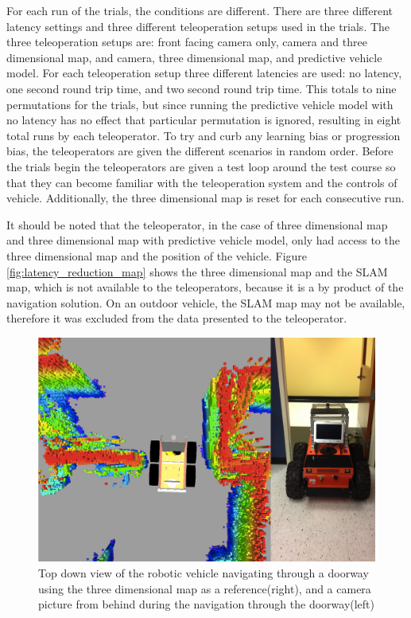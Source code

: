 \documentclass[12pt]{report}
\begin{document}
For each run of the trials, the conditions are different.  There are three different latency settings and three different teleoperation setups used in the trials.  The three teleoperation setups are: front facing camera only, camera and three dimensional map, and camera, three dimensional map, and predictive vehicle model.  For each teleoperation setup three different latencies are used: no latency, one second round trip time, and two second round trip time.  This totals to nine permutations for the trials, but since running the predictive vehicle model with no latency has no effect that particular permutation is ignored, resulting in eight total runs by each teleoperator.  To try and curb any learning bias or progression bias, the teleoperators are given the different scenarios in random order.  Before the trials begin the teleoperators are given a test loop around the test course so that they can become familiar with the teleoperation system and the controls of vehicle.  Additionally, the three dimensional map is reset for each consecutive run.

It should be noted that the teleoperator, in the case of three dimensional map and three dimensional map with predictive vehicle model, only had access to the three dimensional map and the position of the vehicle.  Figure \ref{fig:latency_reduction_map} shows the three dimensional map and the SLAM map, which is not available to the teleoperators, because it is a by product of the navigation solution.  On an outdoor vehicle, the SLAM map may not be available, therefore it was excluded from the data presented to the teleoperator.

\begin{figure}[ht]
  \centering
  \includegraphics[width=6.5in,keepaspectratio]{3d_map_doorway.png}
  \caption{Top down view of the robotic vehicle navigating through a doorway using the three dimensional map as a reference(right), and a camera picture from behind during the navigation through the doorway(left)}
  \label{fig:3d_map_doorway}
\end{figure}
\end{document}
